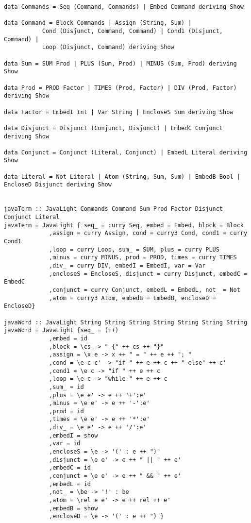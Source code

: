 \documentclass[11pt]{article}
\begin{document}
\begin{verbatim}
data Commands = Seq (Command, Commands) | Embed Command deriving Show

data Command = Block Commands | Assign (String, Sum) |
	       Cond (Disjunct, Command, Command) | Cond1 (Disjunct, Command) |
	       Loop (Disjunct, Command) deriving Show

data Sum = SUM Prod | PLUS (Sum, Prod) | MINUS (Sum, Prod) deriving Show

data Prod = PROD Factor | TIMES (Prod, Factor) | DIV (Prod, Factor) deriving Show

data Factor = EmbedI Int | Var String | EncloseS Sum deriving Show

data Disjunct = Disjunct (Conjunct, Disjunct) | EmbedC Conjunct deriving Show

data Conjunct = Conjunct (Literal, Conjunct) | EmbedL Literal deriving Show

data Literal = Not Literal | Atom (String, Sum, Sum) | EmbedB Bool | EncloseD Disjunct deriving Show


javaTerm :: JavaLight Commands Command Sum Prod Factor Disjunct Conjunct Literal
javaTerm = JavaLight { seq_ = curry Seq, embed = Embed, block = Block
		     ,assign = curry Assign, cond = curry3 Cond, cond1 = curry Cond1
		     ,loop = curry Loop, sum_ = SUM, plus = curry PLUS
		     ,minus = curry MINUS, prod = PROD, times = curry TIMES
		     ,div_ = curry DIV, embedI = EmbedI, var = Var
		     ,encloseS = EncloseS, disjunct = curry Disjunct, embedC = EmbedC
		     ,conjunct = curry Conjunct, embedL = EmbedL, not_ = Not
		     ,atom = curry3 Atom, embedB = EmbedB, encloseD = EncloseD}

javaWord :: JavaLight String String String String String String String
javaWord = JavaLight {seq_ = (++)
		     ,embed = id
		     ,block = \cs -> " {" ++ cs ++ "}"
		     ,assign = \x e -> x ++ " = " ++ e ++ "; "
		     ,cond = \e c c' -> "if " ++ e ++ c ++ " else" ++ c'
		     ,cond1 = \e c -> "if " ++ e ++ c
		     ,loop = \e c -> "while " ++ e ++ c
		     ,sum_ = id
		     ,plus = \e e' -> e ++ '+':e'
		     ,minus = \e e' -> e ++ '-':e'
		     ,prod = id
		     ,times = \e e' -> e ++ '*':e'
		     ,div_ = \e e' -> e ++ '/':e'
		     ,embedI = show
		     ,var = id
		     ,encloseS = \e -> '(' : e ++ ")"
		     ,disjunct = \e e' -> e ++ " || " ++ e'
		     ,embedC = id
		     ,conjunct = \e e' -> e ++ " && " ++ e'
		     ,embedL = id
		     ,not_ = \be -> '!' : be
		     ,atom = \rel e e' -> e ++ rel ++ e'
		     ,embedB = show
		     ,encloseD = \e -> '(' : e ++ ")"}
\end{verbatim}
\end{document}
